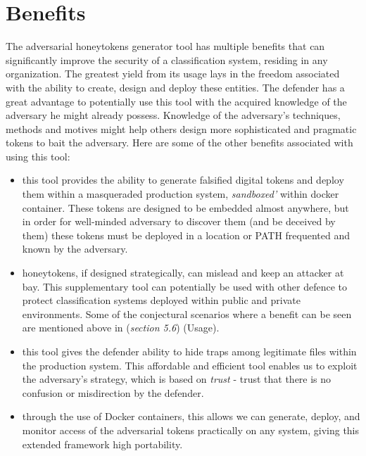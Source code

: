 \documentclass[grad,lot,lof,11pt,oneside,onehalfspace]{RUthesis}
\begin{document}
\section{Benefits}
The adversarial honeytokens generator tool has multiple benefits that can significantly improve the security of a classification system, residing in any organization. The greatest yield from its usage lays in the freedom associated with the ability to create, design and deploy these entities. The defender has a great advantage to potentially use this tool with the acquired knowledge of the adversary he might already possess. Knowledge of the adversary's techniques, methods and motives might help others design more sophisticated and pragmatic tokens to bait the adversary. Here are some of the other benefits associated with using this tool:
\begin{itemize}
	\item this tool provides the ability to generate falsified digital tokens and deploy them within a masqueraded production system, \textit{sandboxed'} within docker container. These tokens are designed to be embedded almost anywhere, but in order for well-minded adversary to discover them (and be deceived by them) these tokens must be deployed in a location or PATH frequented and known by the adversary.
	
	\item honeytokens, if designed strategically, can mislead and keep an attacker at bay. This supplementary tool can potentially be used with other defence to protect classification systems deployed within public and private environments. Some of the  conjectural scenarios where a benefit can be seen are mentioned above in (\textit{section 5.6}) (Usage).
	
	\item this tool gives the defender ability to hide traps among legitimate files within the production system. This affordable and efficient tool enables us to exploit the adversary's strategy, which is based on \textit{trust} - trust that there is no confusion or misdirection by the defender. 
	
	\item through the use of Docker containers, this allows we can generate, deploy, and monitor access of the adversarial tokens practically on any system, giving this extended framework high portability.  
\end{itemize}
\end{document}

